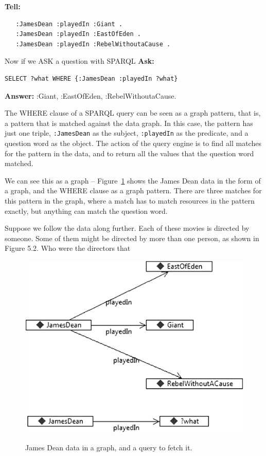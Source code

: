 \textbf{Tell:}
\begin{lstlisting}
   :JamesDean :playedIn :Giant .
   :JamesDean :playedIn :EastOfEden .
   :JamesDean :playedIn :RebelWithoutaCause .
\end{lstlisting}


Now if we ASK a question with SPARQL
\textbf{\textbf{Ask:}} 
\begin{lstlisting}
SELECT ?what WHERE {:JamesDean :playedIn ?what}
\end{lstlisting}
\textbf{\textbf{Answer:}} :Giant, :EastOfEden, :RebelWithoutaCause.

The WHERE clause of a SPARQL query can be seen as a graph pattern, that
is, a pattern that is matched against the data graph. In this case, the
pattern has just one triple, \texttt{:JamesDean} as the subject, \texttt{:playedIn} as the
predicate, and a question word as the object. The action of the query
engine is to find all matches for the pattern in the data, and to return
all the values that the question word matched.

We can see this as a graph -- Figure~\ref{fig:ch06.1} shows the James Dean data in
the form of a graph, and the WHERE clause as a graph pattern. There are
three matches for this pattern in the graph, where a match has to match
resources in the pattern exactly, but anything can match the question
word.

Suppose we follow the data along further. Each of these movies is
directed by someone. Some of them might be directed by more than one
person, as shown in Figure 5.2. Who were the directors that

\begin{figure}
\centering
\includegraphics[width=5in]{media/ch6/f06-01.png}
\label{fig:ch06.1}
\caption{James Dean data in a graph, and a query to fetch it.}
\end{figure}

